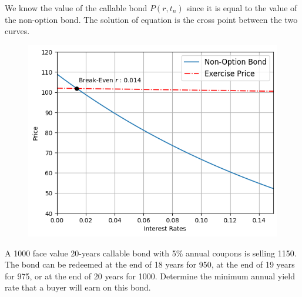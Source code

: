 \documentclass[12pt,a4paper]{article}
\begin{document}
We know the value of the callable bond $P(r,t_n)$ since it is equal to the value of the non-option bond. The solution of equation is the cross point between the two curves.

\begin{figure}[htbp]
	\begin{center}
		\includegraphics[width=0.5\linewidth]{addons/callable_bond}
	\end{center}
	\label{fig:callable_bond}
\end{figure}


\begin{question} A 1000 face value 20-years callable bond with 5\% annual coupons is selling 1150. The bond can be redeemed at the end of 18 years for 950, at the end of 19 years for 975, or at the end of 20 years for 1000. Determine the minimum annual yield rate that a buyer will earn on this bond.
\end{question}
%	
%	
%	
\end{document}
